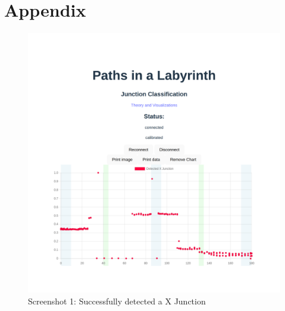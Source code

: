 \pagebreak
\section*{Appendix}

\begin{figure}[H]
    \centering
    \includegraphics[width=\linewidth]{figures/screenshot.png}
    \caption{Screenshot 1: Successfully detected a X Junction}

    \label{fig:screenshot1}
\end{figure}

